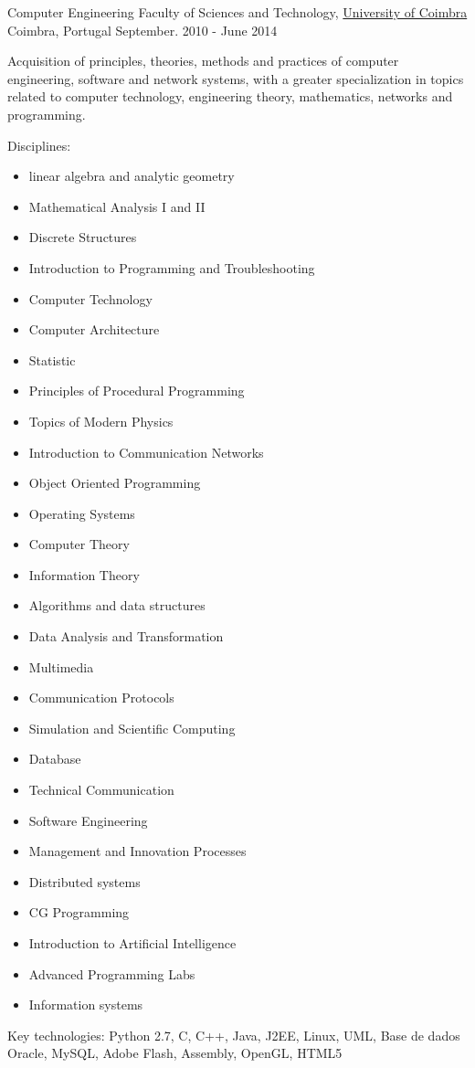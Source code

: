 \begin{cventries}
\cventry
{Computer Engineering} %
{Faculty of Sciences and Technology, \href{https://www.uc.pt/}{University of Coimbra}} %
{Coimbra, Portugal} %
{September. 2010 - June 2014} %
{  %
\begin{cvitems}
\item {Acquisition of principles, theories, methods and practices of computer engineering, software and network systems, with a greater specialization in topics related to computer technology, engineering theory, mathematics, networks and programming.}
\item{Disciplines:}
\begin{itemize}
\item linear algebra and analytic geometry
\item Mathematical Analysis I and II
\item Discrete Structures
\item Introduction to Programming and Troubleshooting
\item Computer Technology
\item Computer Architecture
\item Statistic
\item Principles of Procedural Programming
\item Topics of Modern Physics
\item Introduction to Communication Networks
\item Object Oriented Programming
\item Operating Systems
\item Computer Theory
\item Information Theory
\item Algorithms and data structures
\item Data Analysis and Transformation
\item Multimedia
\item Communication Protocols
\item Simulation and Scientific Computing
\item Database
\item Technical Communication
\item Software Engineering
\item Management and Innovation Processes
\item Distributed systems
\item CG Programming
\item Introduction to Artificial Intelligence
\item Advanced Programming Labs
\item Information systems
\end{itemize}
\item{Key technologies: Python 2.7, C, C++, Java, J2EE, Linux, UML, Base de dados Oracle, MySQL, Adobe Flash, Assembly, OpenGL, HTML5 }
\end{cvitems}
}



\end{cventries}
